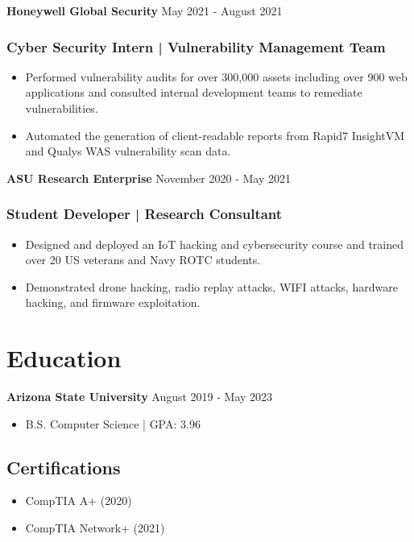 \documentclass{article}
\newcommand{\resumesubsection}[2]{
	\noindent \textbf{#1} \hfill #2
}
\begin{document}
\resumesubsection{Honeywell Global Security}{May 2021 - August 2021}
\subsubsection{Cyber Security Intern | Vulnerability Management Team}
\begin{itemize}
  \item Performed vulnerability audits for over 300,000 assets including over 900 web applications and consulted internal development teams to remediate vulnerabilities.
  \item Automated the generation of client-readable reports from Rapid7 InsightVM and Qualys WAS vulnerability scan data.
\end{itemize}

\resumesubsection{ASU Research Enterprise}{November 2020 - May 2021}
\subsubsection{Student Developer | Research Consultant}
\begin{itemize}
  \item Designed and deployed an IoT hacking and cybersecurity course and trained over 20 US veterans and Navy ROTC students.
  \item Demonstrated drone hacking, radio replay attacks, WIFI attacks, hardware hacking, and firmware exploitation.
\end{itemize}

\section{Education}

\resumesubsection{Arizona State University}{August 2019 - May 2023}
\begin{itemize}
  \item B.S. Computer Science | GPA: 3.96
\end{itemize}

\subsection{Certifications}
\begin{itemize}
    \item CompTIA A+ (2020)
    \item CompTIA Network+ (2021)
\end{itemize}

\end{document}
